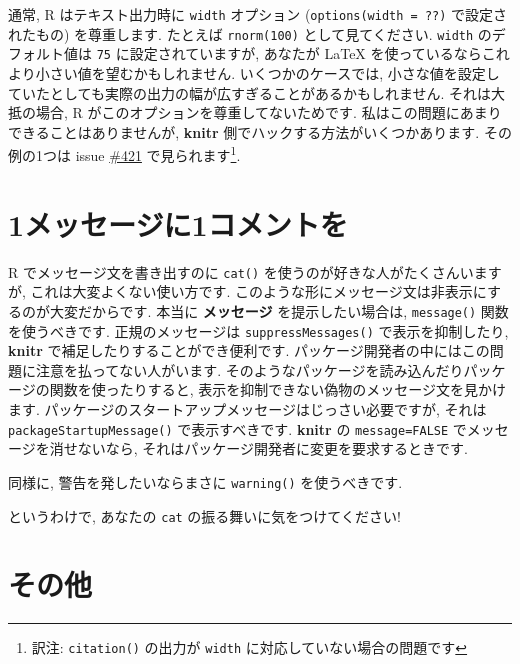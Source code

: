 \documentclass[
  lualatex,ja=standard,jafont=noto-otf]{bxjsreport}
\begin{document}
通常, R はテキスト出力時に \texttt{width} オプション
(\texttt{options(width\ =\ ??)} で設定されたもの) を尊重します. たとえば
\texttt{rnorm(100)} として見てください. \texttt{width} のデフォルト値は
\texttt{75} に設定されていますが, あなたが LaTeX
を使っているならこれより小さい値を望むかもしれません.
いくつかのケースでは,
小さな値を設定していたとしても実際の出力の幅が広すぎることがあるかもしれません.
それは大抵の場合, R がこのオプションを尊重してないためです.
私はこの問題にあまりできることはありませんが, \textbf{knitr}
側でハックする方法がいくつかあります. その例の1つは issue
\href{https://github.com/yihui/knitr/issues/421}{\#421}
で見られます\footnote{訳注: \texttt{citation()} の出力が \texttt{width}
  に対応していない場合の問題です}.

\hypertarget{ux30e1ux30c3ux30bbux30fcux30b8ux306b1ux30b3ux30e1ux30f3ux30c8ux3092}{%
\section*{1メッセージに1コメントを}\label{ux30e1ux30c3ux30bbux30fcux30b8ux306b1ux30b3ux30e1ux30f3ux30c8ux3092}}

R でメッセージ文を書き出すのに \texttt{cat()}
を使うのが好きな人がたくさんいますが, これは大変よくない使い方です.
このような形にメッセージ文は非表示にするのが大変だからです. 本当に
\textbf{メッセージ} を提示したい場合は, \texttt{message()}
関数を使うべきです. 正規のメッセージは \texttt{suppressMessages()}
で表示を抑制したり, \textbf{knitr} で補足したりすることができ便利です.
パッケージ開発者の中にはこの問題に注意を払ってない人がいます.
そのようなパッケージを読み込んだりパッケージの関数を使ったりすると,
表示を抑制できない偽物のメッセージ文を見かけます.
パッケージのスタートアップメッセージはじっさい必要ですが, それは
\texttt{packageStartupMessage()} で表示すべきです. \textbf{knitr} の
\texttt{message=FALSE} でメッセージを消せないなら,
それはパッケージ開発者に変更を要求するときです.

同様に, 警告を発したいならまさに \texttt{warning()} を使うべきです.

というわけで, あなたの \texttt{cat} の振る舞いに気をつけてください!

\hypertarget{ux305dux306eux4ed6}{%
\section*{その他}\label{ux305dux306eux4ed6}}
\end{document}
